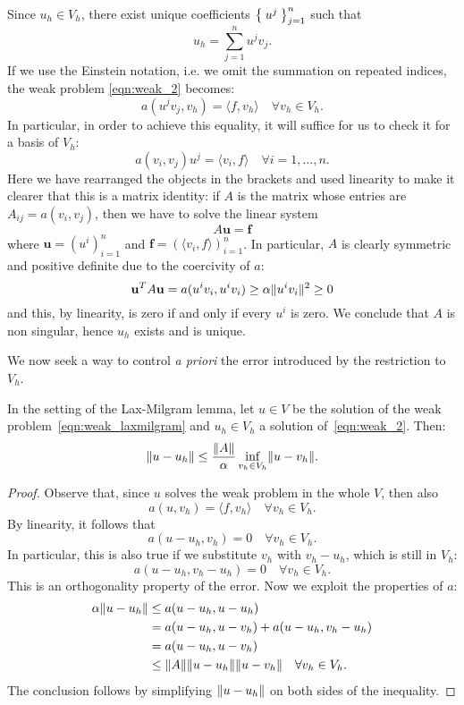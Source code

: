 Since $u_h \in V_h$, there exist unique coefficients $\Set{u^j}_{j=1}^n$ such that
\[
u_h = \sum_{j=1}^n u^j v_j.
\]
If we use the Einstein notation, i.e. we omit the summation on repeated indices, the weak problem \ref{eqn:weak_2} becomes:
\[
a(u^j v_j ,v_h) = \langle f,v_h \rangle \quad \forall v_h\in V_h.
\]
In particular, in order to achieve this equality, it will suffice for us to check it for a basis of $V_h$:
\[
a(v_i, v_j)  u^j = \langle v_i,f \rangle \quad \forall i=1,\dots,n.
\]
Here we have rearranged the objects in the brackets and used linearity to make it clearer that this is a matrix identity: if $A$ is the matrix whose entries are $A_{ij}=a(v_i, v_j)$, then we have to solve the linear system
\[
A \mathbf{u} = \mathbf{f}
\]
where $\mathbf{u}=(u^i)_{i=1}^n$ and $\mathbf{f}=(\langle v_i,f \rangle)_{i=1}^n$.
In particular, $A$ is clearly symmetric and positive definite due to the coercivity of $a$:
\[
\mathbf{u}^T A \mathbf{u} = a(u^i v_i, u^i v_i) \ge \alpha \lVert u^i v_i\rVert^2 \ge 0
\]
and this, by linearity, is zero if and only if every $u^i$ is zero. We conclude that $A$ is non singular, hence $u_h$ exists and is unique.

We now seek a way to control \emph{a priori} the error introduced by the restriction to $V_h$.
\begin{lemma}[Ceà] \label{lemma:cea}
In the setting of the Lax-Milgram lemma, let $u\in V$ be the solution of the weak problem~\eqref{eqn:weak_laxmilgram} and $u_h \in V_h$ a solution of~\eqref{eqn:weak_2}. Then:
\[
\lVert u - u_h\rVert \le \frac{\lVert A\rVert}{\alpha} \inf_{v_h \in V_h} \lVert u - v_h\rVert.
\]
\end{lemma}
\begin{proof}
Observe that, since $u$ solves the weak problem in the whole $V$, then also
\[
a(u,v_h) = \langle f,v_h \rangle \quad \forall v_h\in V_h.
\]
By linearity, it follows that
\[
a(u - u_h,v_h) = 0 \quad \forall v_h\in V_h.
\]
In particular, this is also true if we substitute $v_h$ with $v_h - u_h$, which is still in $V_h$:
\[
a(u - u_h, v_h - u_h) = 0 \quad \forall v_h\in V_h.
\]
This is an orthogonality property of the error. Now we exploit the properties of $a$:
\begin{align}
\alpha \lVert u - u_h\rVert & \le a(u - u_h, u - u_h) \\
& = a(u - u_h, u - v_h) + a(u - u_h, v_h - u_h) \\
& = a(u - u_h, u - v_h) \\
& \le \lVert A\rVert \lVert u - u_h\rVert \lVert u - v_h\rVert \quad \forall v_h \in V_h.
\end{align}
The conclusion follows by simplifying $\lVert u - u_h\rVert$ on both sides of the inequality.
\end{proof}

